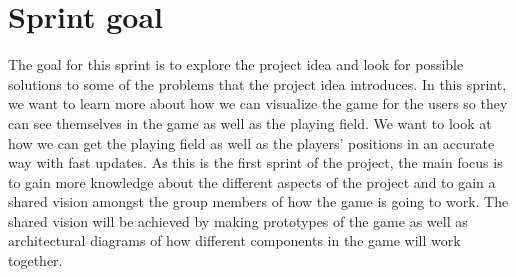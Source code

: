 \section{Sprint goal}
The goal for this sprint is to explore the project idea and look for possible solutions to some of the problems that the project idea introduces.
In this sprint, we want to learn more about how we can visualize the game for the users so they can see themselves in the game as well as the playing field.
We want to look at how we can get the playing field as well as the players' positions in an accurate way with fast updates.
As this is the first sprint of the project, the main focus is to gain more knowledge about the different aspects of the project and to gain a shared vision amongst the group members of how the game is going to work.
The shared vision will be achieved by making prototypes of the game as well as architectural diagrams of how different components in the game will work together.

